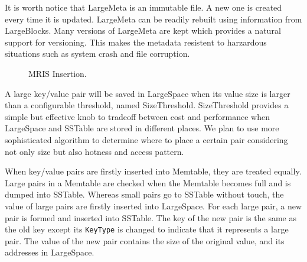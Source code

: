 It is worth notice that LargeMeta is an immutable file. A new one is
created every time it is updated. LargeMeta can be readily rebuilt
using information from LargeBlocks. Many versions of LargeMeta are
kept which provides a natural support for versioning. This makes the
metadata resistent to harzardous situations such as system crash and
file corruption.

\begin{figure}[t]
\begin{centering}
\caption{MRIS Insertion.}
\label{fig:mrisinsert}
\end{centering}
\end{figure}

A large key/value pair will be saved in LargeSpace when its value size
is larger than a configurable threshold, named SizeThreshold.
SizeThreshold provides a simple but effective knob to tradeoff between
cost and performance when LargeSpace and SSTable are stored in
different places. We plan to use more sophisticated algorithm to
determine where to place a certain pair considering not only size but
also hotness and access pattern.

When key/value pairs are firstly inserted into Memtable, they are
treated equally. Large pairs in a Memtable are checked when the
Memtable becomes full and is dumped into SSTable. Whereas small pairs
go to SSTable without touch, the value of large pairs are firstly
inserted into LargeSpace. For each large pair, a new pair is formed
and inserted into SSTable. The key of the new pair is the same as the
old key except its \texttt{KeyType} is changed to indicate that it
represents a large pair.  The value of the new pair contains the size
of the original value, and its addresses in LargeSpace.


